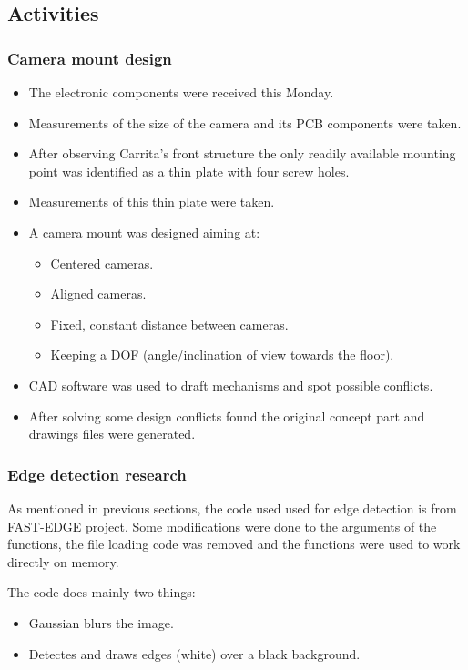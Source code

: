 \subsection{Activities}


\subsubsection{Camera mount design}
\begin{itemize}
	\item The electronic components were received this Monday.
	\item Measurements of the size of the camera and its PCB components were taken.
	\item After observing Carrita's front structure the only readily available mounting point was identified as a thin plate with four screw holes.
	\item Measurements of this thin plate were taken.
	\item A camera mount was designed aiming at:
	\begin{itemize}
		\item Centered cameras.
		\item Aligned cameras.
		\item Fixed, constant distance between cameras.
		\item Keeping a DOF (angle/inclination of view towards the floor).
	\end{itemize}
	\item CAD software was used to draft mechanisms and spot possible conflicts.
	\item After solving some design conflicts found the original concept part and drawings files were generated.
\end{itemize}



\subsubsection{Edge detection research}
As mentioned in previous sections, the code used used for edge detection is from FAST-EDGE project. Some modifications were done to the arguments of the functions, the file loading code was removed and the functions were used to work directly on memory.

The code does mainly two things:
\begin{itemize}
	\item Gaussian blurs the image.
	\item Detectes and draws edges (white) over a black background.
\end{itemize}

